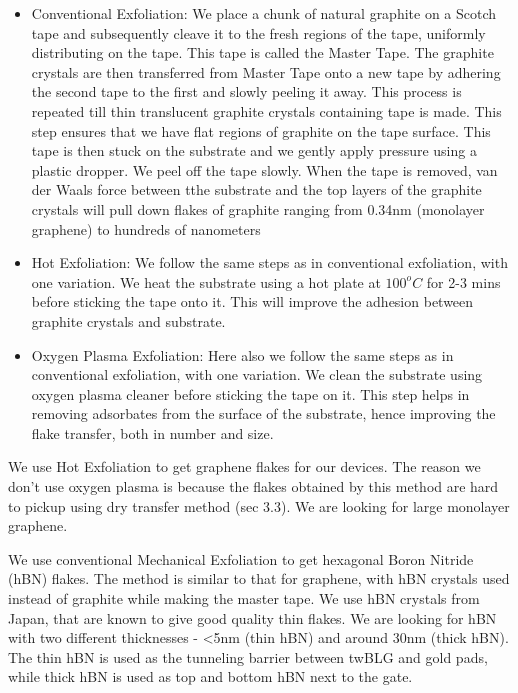 \begin{itemize}
    \item Conventional Exfoliation:
    We place a chunk of natural graphite on a Scotch tape and subsequently cleave it to the fresh regions of the tape, uniformly distributing on the tape. This tape is called the Master Tape. The graphite crystals are then transferred from Master Tape onto a new tape by adhering the second tape to the first and slowly peeling it away. This process is repeated till thin translucent graphite crystals containing tape is made. This step ensures that we have flat regions of graphite on the tape surface. This tape is then stuck on the substrate and we gently apply pressure using a plastic dropper. We peel off the tape slowly. When the tape is removed, van der Waals force between tthe substrate and the top layers of the graphite crystals will pull down flakes of graphite ranging from 0.34nm (monolayer graphene) to hundreds of nanometers
    \item Hot Exfoliation:
    We follow the same steps as in conventional exfoliation, with one variation. We heat the substrate using a hot plate at $100 ^o C$ for 2-3 mins before sticking the tape onto it. This will improve the adhesion between graphite crystals and substrate.
    \item Oxygen Plasma Exfoliation:
    Here also we follow the same steps as in conventional exfoliation, with one variation. We clean the substrate using oxygen plasma cleaner before sticking the tape on it. This step helps in removing adsorbates from the surface of the substrate, hence improving the flake transfer, both in number and size.
   
    \end{itemize}

We use Hot Exfoliation to get graphene flakes for our devices. The reason we don't use oxygen plasma is because the flakes obtained by this method are hard to pickup using dry transfer method (sec 3.3). We are looking for large monolayer graphene.

We use conventional Mechanical Exfoliation to get hexagonal Boron Nitride (hBN) flakes. The method is similar to that for graphene, with hBN crystals used instead of graphite while making the master tape. We use hBN crystals from Japan, that are known to give good quality thin flakes. We are looking for hBN with two different thicknesses - <5nm (thin hBN) and around 30nm (thick hBN). The thin hBN is used as the tunneling barrier between twBLG and gold pads, while thick hBN is used as top and bottom hBN next to the gate.

